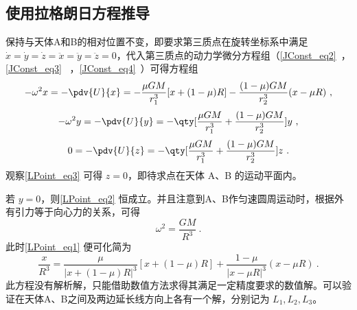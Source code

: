

\subsection{使用拉格朗日方程推导}

保持与天体A和B的相对位置不变，即要求第三质点在旋转坐标系中满足 $\dot{x}=\dot{y}=\dot{z}=\ddot{x}=\ddot{y}=\ddot{z}=0$，代入第三质点的动力学微分方程组（\autoref{JConst_eq2}~，\autoref{JConst_eq3}~ ，\autoref{JConst_eq4}~）可得方程组
\begin{equation}\label{LPoint_eq1}
-\omega^2 x =- \pdv{U}{x}=-\frac{\mu GM}{r_1^3}[x+(1-\mu)R]-\frac{(1-\mu)GM}{r_2^3}(x-\mu R)~,
\end{equation}
\begin{equation}\label{LPoint_eq2}
-\omega^2 y =- \pdv{U}{y}=-\qty[\frac{\mu GM}{r_1^3}+\frac{(1-\mu)GM}{r_2^3}]y~,
\end{equation}
\begin{equation}\label{LPoint_eq3}
0 =- \pdv{U}{z} =-\qty[\frac{\mu GM}{r_1^3}+\frac{(1-\mu)GM}{r_2^3}]z~.
\end{equation}
观察\autoref{LPoint_eq3} 可得 $z=0$，即待求点在天体 A、B 的运动平面内。

若 $y=0$，则\autoref{LPoint_eq2} 恒成立。并且注意到A、B作匀速圆周运动时，根据外有引力等于向心力的关系，可得
\begin{equation}%
\omega^2 =\frac{GM}{R^3}~.
\end{equation}
此时\autoref{LPoint_eq1} 便可化简为
\begin{equation}%
\frac{x}{R^3} =\frac{\mu}{|x+(1-\mu)R|^3}[x+(1-\mu)R]+\frac{1-\mu}{|x-\mu R|^3}(x-\mu R)~.
\end{equation}
此方程没有解析解，只能借助数值方法求得其满足一定精度要求的数值解。可以验证在天体A、B之间及两边延长线方向上各有一个解，分别记为 $L_1,L_2,L_3$。

